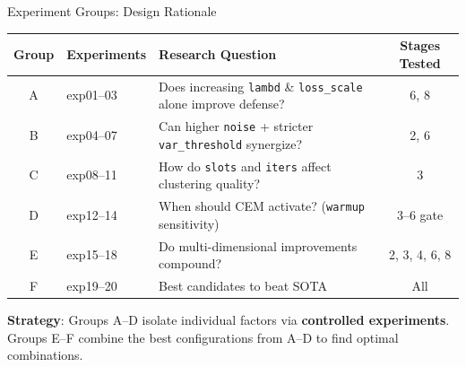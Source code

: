 \documentclass[aspectratio=169, 10pt]{beamer}
\newcommand{\param}[1]{\textcolor{paramred}{\texttt{#1}}}
\begin{document}
\begin{frame}{Experiment Groups: Design Rationale}

\begin{center}
\small
\begin{tabular}{clp{5.5cm}c}
\toprule
\textbf{Group} & \textbf{Experiments} & \textbf{Research Question} & \textbf{Stages Tested} \\
\midrule
\rowcolor{blue!5}
A & exp01--03 & Does increasing \param{lambd} \& \param{loss\_scale} alone improve defense? & 6, 8 \\
\rowcolor{teal!5}
B & exp04--07 & Can higher \param{noise} + stricter \param{var\_threshold} synergize? & 2, 6 \\
\rowcolor{violet!5}
C & exp08--11 & How do \param{slots} and \param{iters} affect clustering quality? & 3 \\
\rowcolor{orange!5}
D & exp12--14 & When should CEM activate? (\param{warmup} sensitivity) & 3--6 gate \\
\rowcolor{red!5}
E & exp15--18 & Do multi-dimensional improvements compound? & 2, 3, 4, 6, 8 \\
\rowcolor{green!5}
F & exp19--20 & Best candidates to beat SOTA & All \\
\bottomrule
\end{tabular}
\end{center}

\vspace{0.3cm}
\textbf{Strategy}: Groups A--D isolate individual factors via \textbf{controlled experiments}.\\
Groups E--F combine the best configurations from A--D to find optimal combinations.

\end{frame}
\end{document}
